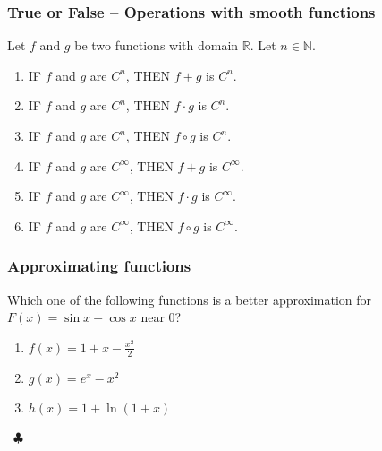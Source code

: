 \documentclass[14pt]{beamer}
\begin{document}
	\begin{frame}[t]
		\frametitle{True or False -- Operations with smooth functions}

		Let $f$ and $g$ be two functions with domain $\mathbb{R}$. Let $n \in \mathbb{N}$.
		\vspace{.2cm}

		\begin{enumerate}
			\item IF $f$ and $g$ are $C^{n}$, \; THEN $f + g$ is $C^{n}$.

			\item IF $f$ and $g$ are $C^{n}$, \; THEN $f \cdot g$ is $C^{n}$.

			\item IF $f$ and $g$ are $C^{n}$, \; THEN $f \circ g$ is $C^{n}$.

			\item IF $f$ and $g$ are $C^{\infty}$, \; THEN $f + g$ is $C^{\infty}$.

			\item IF $f$ and $g$ are $C^{\infty}$, \; THEN $f \cdot g$ is $C^{\infty}$.

			\item IF $f$ and $g$ are $C^{\infty}$, \; THEN $f \circ g$ is $C^{\infty}$.
		\end{enumerate}
	\end{frame}

	\begin{frame}[t]
		\frametitle{Approximating functions }

		Which one of the following functions is a better approximation for \;
		$\displaystyle F(x) = \sin x + \cos x$ \; near 0?
		\vspace{.2cm}
		\begin{enumerate}
			\item $\displaystyle f(x) = 1 + x - \frac{x^{2}}{2}$
				\vspace{.2cm}

			\item $\displaystyle g(x) = e^{x}-x^{2}$
				\vspace{.2cm}

			\item $\displaystyle h(x) = 1 + \ln (1+x)$
		\end{enumerate}

		\ \hfill \href{https://www.desmos.com/calculator/1hqedw17c8}{$\clubsuit$}
	\end{frame}
\end{document}
